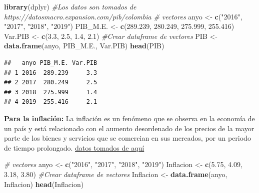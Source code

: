 \documentclass[
  11pt,
]{book}
\newenvironment{Shaded}{\begin{snugshade}}{\end{snugshade}}
\newcommand{\CommentTok}[1]{\textcolor[rgb]{0.56,0.35,0.01}{\textit{#1}}}
\newcommand{\FloatTok}[1]{\textcolor[rgb]{0.00,0.00,0.81}{#1}}
\newcommand{\KeywordTok}[1]{\textcolor[rgb]{0.13,0.29,0.53}{\textbf{#1}}}
\newcommand{\NormalTok}[1]{#1}
\newcommand{\StringTok}[1]{\textcolor[rgb]{0.31,0.60,0.02}{#1}}
\begin{document}
\begin{Shaded}
\begin{Highlighting}[]
\KeywordTok{library}\NormalTok{(dplyr)}
\CommentTok{#Los datos son tomados de https://datosmacro.expansion.com/pib/colombia}
\CommentTok{# vectores }
\NormalTok{anyo <-}\StringTok{ }\KeywordTok{c}\NormalTok{(}\StringTok{"2016"}\NormalTok{, }\StringTok{"2017"}\NormalTok{, }\StringTok{"2018"}\NormalTok{, }\StringTok{"2019"}\NormalTok{)}
\NormalTok{PIB_M.E. <-}\StringTok{ }\KeywordTok{c}\NormalTok{(}\FloatTok{289.239}\NormalTok{, }\FloatTok{280.249}\NormalTok{, }\FloatTok{275.999}\NormalTok{, }\FloatTok{255.416}\NormalTok{)}
\NormalTok{Var.PIB <-}\StringTok{ }\KeywordTok{c}\NormalTok{(}\FloatTok{3.3}\NormalTok{, }\FloatTok{2.5}\NormalTok{, }\FloatTok{1.4}\NormalTok{, }\FloatTok{2.1}\NormalTok{)}
\CommentTok{#Crear dataframe de vectores}
\NormalTok{PIB <-}\StringTok{ }\KeywordTok{data.frame}\NormalTok{(anyo, PIB_M.E., Var.PIB)}
\KeywordTok{head}\NormalTok{(PIB)}
\end{Highlighting}
\end{Shaded}

\begin{verbatim}
##   anyo PIB_M.E. Var.PIB
## 1 2016  289.239     3.3
## 2 2017  280.249     2.5
## 3 2018  275.999     1.4
## 4 2019  255.416     2.1
\end{verbatim}

\textbf{Para la inflación:} La inflación es un fenómeno que se observa
en la economía de un país y está relacionado con el aumento desordenado
de los precios de la mayor parte de los bienes y servicios que se
comercian en sus mercados, por un periodo de tiempo prolongado.
\href{https://es.wikipedia.org/wiki/Anexo:Variaci\%C3\%B3n_de_la_inflaci\%C3\%B3n_de_Colombia_desde_1946}{datos
tomados de aquí}

\begin{Shaded}
\begin{Highlighting}[]
\CommentTok{# vectores }
\NormalTok{anyo <-}\StringTok{ }\KeywordTok{c}\NormalTok{(}\StringTok{"2016"}\NormalTok{, }\StringTok{"2017"}\NormalTok{, }\StringTok{"2018"}\NormalTok{, }\StringTok{"2019"}\NormalTok{)}
\NormalTok{Inflacion <-}\StringTok{ }\KeywordTok{c}\NormalTok{(}\FloatTok{5.75}\NormalTok{, }\FloatTok{4.09}\NormalTok{, }\FloatTok{3.18}\NormalTok{, }\FloatTok{3.80}\NormalTok{)}
\CommentTok{#Crear dataframe de vectores}
\NormalTok{Inflacion <-}\StringTok{ }\KeywordTok{data.frame}\NormalTok{(anyo, Inflacion)}
\KeywordTok{head}\NormalTok{(Inflacion)}
\end{Highlighting}
\end{Shaded}
\end{document}
